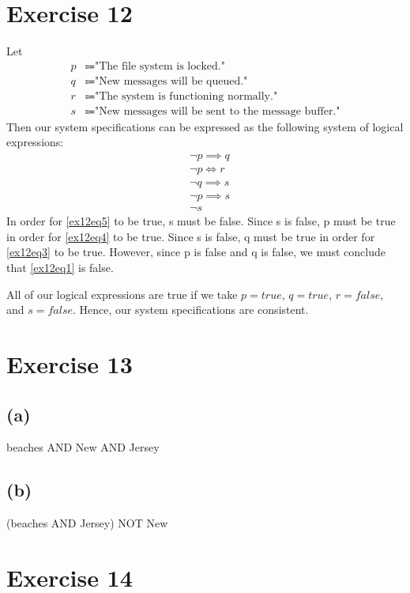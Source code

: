 \documentclass{article}
\begin{document}
\pagebreak

\section{Exercise 12}
Let
\begin{align*}
	p & \Coloneqq \text{"The file system is locked."}                       \\
	q & \Coloneqq \text{"New messages will be queued."}                     \\
	r & \Coloneqq \text{"The system is functioning normally."}              \\
	s & \Coloneqq \text{"New messages will be sent to the message buffer."}
\end{align*}
Then our system specifications can be expressed as the following system of logical expressions:
\begin{align}
	 & \neg p \implies q \label{ex12eq1} \\
	 & \neg p \iff r \label{ex12eq2}     \\
	 & \neg q \implies s \label{ex12eq3} \\
	 & \neg p \implies s \label{ex12eq4} \\
	 & \neg s \label{ex12eq5}
\end{align}
In order for \eqref{ex12eq5} to be true, s must be false. Since s is false, p must be true in order for \eqref{ex12eq4} to be true. Since s is false, q must be true in order for \eqref{ex12eq3} to be true. However, since p is false and q is false, we must conclude that \eqref{ex12eq1} is false.

All of our logical expressions are true if we take $p = true$, $q = true$, $r = false$, and $s = false$. Hence, our system specifications are consistent.

\pagebreak

\section{Exercise 13}
\subsection{(a)}
beaches AND New AND Jersey
\subsection{(b)}
(beaches AND Jersey) NOT New

\pagebreak

\section{Exercise 14}
\end{document}
